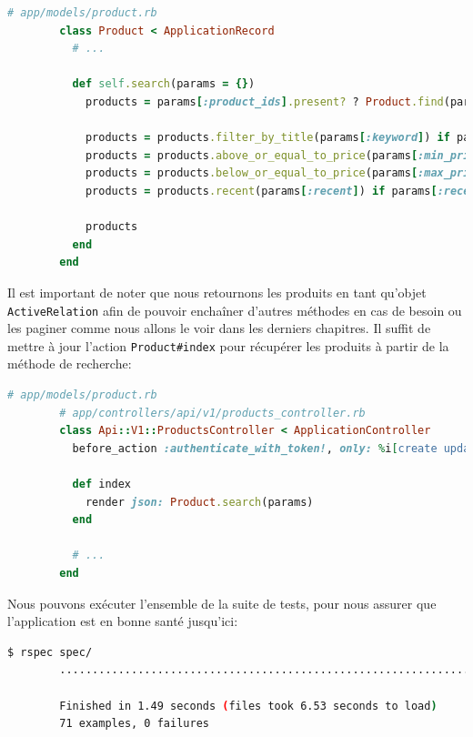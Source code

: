 \documentclass[]{report}
\begin{document}
      \begin{scriptsize}
        \begin{lstlisting}[language=ruby, caption={Implémentation du moteur de recherche des produits}, label={lst:product_search}]
        # app/models/product.rb
        class Product < ApplicationRecord
          # ...

          def self.search(params = {})
            products = params[:product_ids].present? ? Product.find(params[:product_ids]) : Product.all

            products = products.filter_by_title(params[:keyword]) if params[:keyword]
            products = products.above_or_equal_to_price(params[:min_price].to_f) if params[:min_price]
            products = products.below_or_equal_to_price(params[:max_price].to_f) if params[:max_price]
            products = products.recent(params[:recent]) if params[:recent].present?

            products
          end
        end
        \end{lstlisting}
      \end{scriptsize}

      Il est important de noter que nous retournons les produits en tant qu'objet \verb|ActiveRelation| afin de pouvoir enchaîner d'autres méthodes en cas de besoin ou les paginer comme nous allons le voir dans les derniers chapitres. Il suffit de mettre à jour l'action \verb|Product#index| pour récupérer les produits à partir de la méthode de recherche:

      \begin{scriptsize}
        \begin{lstlisting}[language=ruby]
        # app/models/product.rb
        # app/controllers/api/v1/products_controller.rb
        class Api::V1::ProductsController < ApplicationController
          before_action :authenticate_with_token!, only: %i[create update destroy]

          def index
            render json: Product.search(params)
          end

          # ...
        end
        \end{lstlisting}
      \end{scriptsize}

      Nous pouvons exécuter l'ensemble de la suite de tests, pour nous assurer que l'application est en bonne santé jusqu'ici:

      \begin{scriptsize}
        \begin{lstlisting}[language=bash]
        $ rspec spec/
        .......................................................................

        Finished in 1.49 seconds (files took 6.53 seconds to load)
        71 examples, 0 failures
        \end{lstlisting}
      \end{scriptsize}
\end{document}
